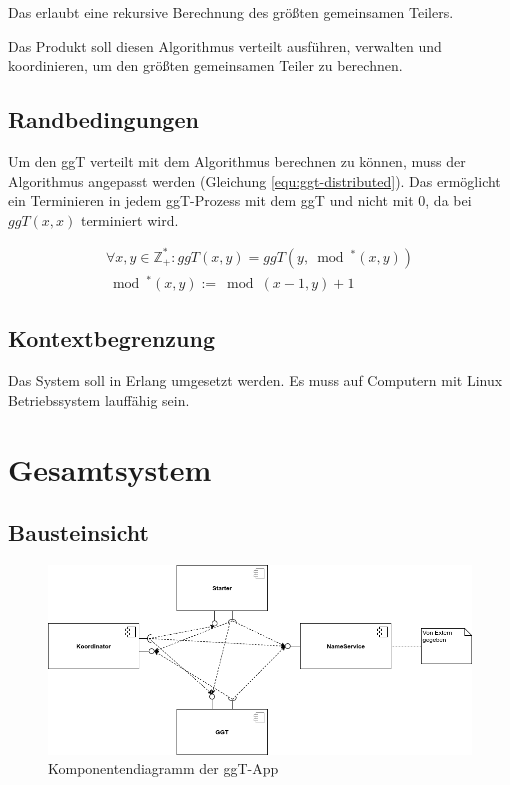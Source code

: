 \documentclass{article}
\begin{document}
Das erlaubt eine rekursive Berechnung des größten gemeinsamen Teilers.

Das Produkt soll diesen Algorithmus verteilt ausführen, verwalten und koordinieren, um den größten gemeinsamen Teiler zu
berechnen.

\subsection{Randbedingungen}
Um den ggT verteilt mit dem Algorithmus berechnen zu können, muss der Algorithmus angepasst werden
(Gleichung \ref{equ:ggt-distributed}). Das ermöglicht ein Terminieren in jedem ggT-Prozess mit dem ggT und nicht mit 0,
da bei $ggT(x,x)$ terminiert wird.

\begin{multline}
\forall x,y \in \mathbb{Z}^{*}_{+}: ggT(x,y) = ggT(y,\bmod{^{*}(x,y)})\\
\bmod{^{*}(x,y)} := \bmod{(x-1, y)} + 1
\label{equ:ggt-distributed}
\end{multline}

\subsection{Kontextbegrenzung}
Das System soll in Erlang umgesetzt werden. Es muss auf Computern mit Linux Betriebssystem lauffähig sein.

\newpage

\section{Gesamtsystem}

\subsection{Bausteinsicht}
\begin{figure}[H]
    \centering
    \includegraphics[width=1.0\textwidth]{component-diagram.png}
    \caption[seq-dia]{Komponentendiagramm der ggT-App}
    \label{fig:component-diagram}
\end{figure}
\end{document}
